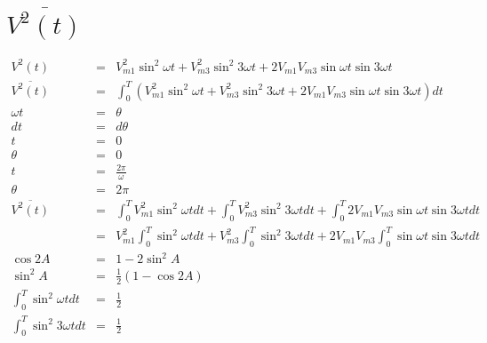\documentclass[a4paper,12pt]{article}
\begin{document}
\section{$\overline{V^{2}(t)}$}

\begin{eqnarray*}
V^{2}(t)	& = & V^{2}_{m1} \sin^{2}{\omega t} + V^{2}_{m3}
\sin^{2}{3 \omega t} + 2V_{m1}V_{m3} \sin{\omega t}\sin{3 \omega t} \\
\overline{V^{2}(t)}	& = & \int^{T}_{0} \left( V^{2}_{m1} \sin^{2}{\omega t} + V^{2}_{m3} \sin^{2}{3 \omega t} + 2V_{m1}V_{m3} \sin{\omega t}\sin{3 \omega t} \right) dt \\
\omega t        & = & \theta \\
dt					 & = & d \theta \\
t               & = & 0 \\
\theta          & = & 0 \\
t               & = & \frac{2 \pi}{\omega} \\
\theta          & = & 2 \pi \\
\overline{V^{2}(t)}  & = & \int^{T}_{0} V^{2}_{m1} \sin^{2}{\omega t}dt +
\int^{T}_{0} V^{2}_{m3} \sin^{2}{3 \omega t}dt + \int^{T}_{0}
2V_{m1}V_{m3} \sin{\omega t}\sin{3 \omega t}dt \\
			 & = & V^{2}_{m1} \int^{T}_{0} \sin^{2}{\omega t}dt +
			 V^{2}_{m3} \int^{T}_{0} \sin^{2}{3 \omega t}dt + 2V_{m1}V_{m3}
			 \int^{T}_{0} \sin{\omega t}\sin{3 \omega t}dt \\
\cos{2A}        & = & 1 - 2 \sin^{2}{A} \\
\sin^{2}{A}     & = & \frac{1}{2} \left( 1 - \cos{2A} \right) \\
\int^{T}_{0} \sin^{2}{\omega t}dt & = & \frac{1}{2} \\
\int^{T}_{0} \sin^{2}{3 \omega t}dt & = & \frac{1}{2} \\
\end{eqnarray*}
\end{document}
